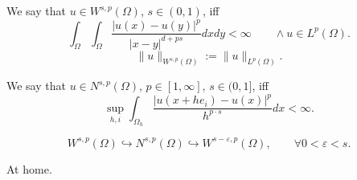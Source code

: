 \documentclass[12pt]{article}					%
\begin{document}
\begin{definice}
	We say that $u \in W^{s, p}(Ω)$, $s \in (0, 1)$, iff
	$$ \int_Ω \int_Ω \frac{|u(x) - u(y)|^p}{|x - y|^{d + ps}} dx dy < ∞ \qquad \land u \in L^p(Ω). $$
	$$ \|u\|_{W^{s, p}(Ω)} := \|u\|_{L^p(Ω)}. $$
\end{definice}

\begin{definice}
	We say that $u \in N^{s, p}(Ω)$, $p \in [1, ∞]$, $s \in (0, 1]$, iff
	$$ \sup_{h, i} \int_{Ω_h} \frac{|u(x + h e_i) - u(x)|^p}{h^{p·s}} dx < ∞. $$
\end{definice}

\begin{lemma}
	$$ W^{s, p}(Ω) \hookrightarrow N^{s, p}(Ω) \hookrightarrow W^{s - ε, p}(Ω), \qquad \forall 0 < ε < s. $$
	
	\begin{dukazin}
		At home.
	\end{dukazin}
\end{lemma}
\end{document}
